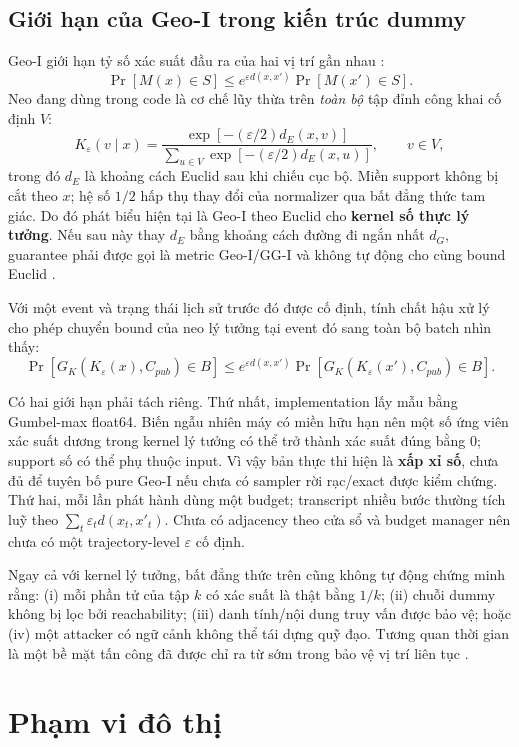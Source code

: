 \documentclass[12pt,a4paper,oneside]{report}
\begin{document}
\section{Giới hạn của Geo-I trong kiến trúc dummy}

Geo-I giới hạn tỷ số xác suất đầu ra của hai vị trí gần nhau \citep{andres2013geo}:
\[
\Pr[M(x)\in S]
\leq e^{\varepsilon d(x,x')}
\Pr[M(x')\in S].
\]
Neo đang dùng trong code là cơ chế lũy thừa trên \emph{toàn bộ} tập đỉnh công khai cố định $V$:
\[
K_{\varepsilon}(v\mid x)
=\frac{\exp[-(\varepsilon/2)d_E(x,v)]}
{\sum_{u\in V}\exp[-(\varepsilon/2)d_E(x,u)]},\qquad v\in V,
\]
trong đó $d_E$ là khoảng cách Euclid sau khi chiếu cục bộ. Miền support không bị cắt theo $x$; hệ số $1/2$ hấp thụ thay đổi của normalizer qua bất đẳng thức tam giác. Do đó phát biểu hiện tại là Geo-I theo Euclid cho \textbf{kernel số thực lý tưởng}. Nếu sau này thay $d_E$ bằng khoảng cách đường đi ngắn nhất $d_G$, guarantee phải được gọi là metric Geo-I/GG-I và không tự động cho cùng bound Euclid \citep{takagi2019ggi}.

Với một event và trạng thái lịch sử trước đó được cố định, tính chất hậu xử lý cho phép chuyển bound của neo lý tưởng tại event đó sang toàn bộ batch nhìn thấy:
\[
\Pr[G_K(K_{\varepsilon}(x),C_{pub})\in B]
\le e^{\varepsilon d(x,x')}
\Pr[G_K(K_{\varepsilon}(x'),C_{pub})\in B].
\]

Có hai giới hạn phải tách riêng. Thứ nhất, implementation lấy mẫu bằng Gumbel-max float64. Biến ngẫu nhiên máy có miền hữu hạn nên một số ứng viên xác suất dương trong kernel lý tưởng có thể trở thành xác suất đúng bằng 0; support số có thể phụ thuộc input. Vì vậy bản thực thi hiện là \textbf{xấp xỉ số}, chưa đủ để tuyên bố pure Geo-I nếu chưa có sampler rời rạc/exact được kiểm chứng. Thứ hai, mỗi lần phát hành dùng một budget; transcript nhiều bước thường tích luỹ theo $\sum_t\varepsilon_t d(x_t,x'_t)$. Chưa có adjacency theo cửa sổ và budget manager nên chưa có một trajectory-level $\varepsilon$ cố định.

Ngay cả với kernel lý tưởng, bất đẳng thức trên cũng không tự động chứng minh rằng: (i) mỗi phần tử của tập $k$ có xác suất là thật bằng $1/k$; (ii) chuỗi dummy không bị lọc bởi reachability; (iii) danh tính/nội dung truy vấn được bảo vệ; hoặc (iv) một attacker có ngữ cảnh không thể tái dựng quỹ đạo. Tương quan thời gian là một bề mặt tấn công đã được chỉ ra từ sớm trong bảo vệ vị trí liên tục \citep{xiao2015temporal}.

\chapter{Phạm vi đô thị}
\end{document}
